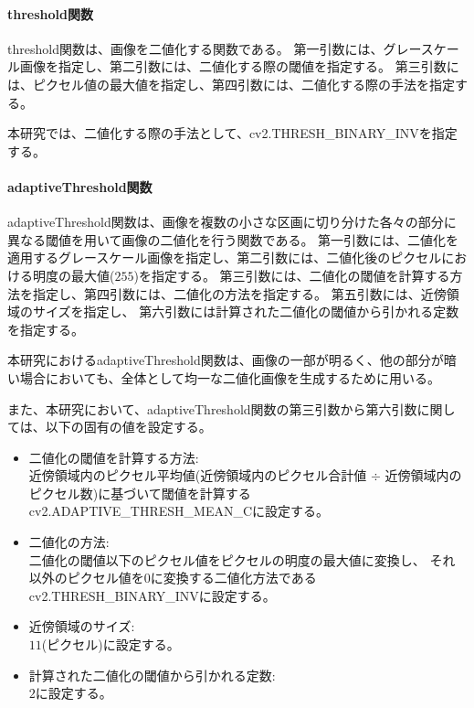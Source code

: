 \paragraph{threshold関数}
threshold関数は、画像を二値化する関数である。
第一引数には、グレースケール画像を指定し、第二引数には、二値化する際の閾値を指定する。
第三引数には、ピクセル値の最大値を指定し、第四引数には、二値化する際の手法を指定する。
\par
本研究では、二値化する際の手法として、cv2.THRESH\_BINARY\_INV\cite{Threshold}を指定する。
\paragraph{adaptiveThreshold関数}
adaptiveThreshold関数は、画像を複数の小さな区画に切り分けた各々の部分に異なる閾値を用いて画像の二値化を行う関数である。
第一引数には、二値化を適用するグレースケール画像を指定し、第二引数には、二値化後のピクセルにおける明度の最大値($255$)を指定する。
第三引数には、二値化の閾値を計算する方法を指定し、第四引数には、二値化の方法を指定する。
第五引数には、近傍領域のサイズを指定し、
第六引数には計算された二値化の閾値から引かれる定数を指定する。
\par
本研究におけるadaptiveThreshold関数は、画像の一部が明るく、他の部分が暗い場合においても、全体として均一な二値化画像を生成するために用いる。
\par
また、本研究において、adaptiveThreshold関数の第三引数から第六引数に関しては、以下の固有の値を設定する。
\begin{itemize}
      \setlength{\itemsep}{0pt}
            \setlength{\parsep}{0pt}
      \item 二値化の閾値を計算する方法:\\
            近傍領域内のピクセル平均値(近傍領域内のピクセル合計値 $\div$ 近傍領域内のピクセル数)に基づいて閾値を計算するcv2.ADAPTIVE\_THRESH\_MEAN\_C\cite{AdaptiveThreshold}に設定する。
      \item 二値化の方法:\\
            二値化の閾値以下のピクセル値をピクセルの明度の最大値に変換し、
            それ以外のピクセル値を$0$に変換する二値化方法であるcv2.THRESH\_BINARY\_INV\cite{Threshold}に設定する。
      \item 近傍領域のサイズ:\\
            $11$(ピクセル)に設定する。
      \item 計算された二値化の閾値から引かれる定数:\\
            $2$に設定する。
\end{itemize}
